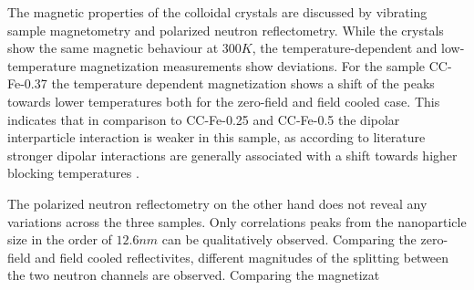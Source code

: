 \documentclass[\main/dresen_thesis.tex]{subfiles}
\begin{document}
  The magnetic properties of the colloidal crystals are discussed by vibrating sample magnetometry and polarized neutron reflectometry.
  While the crystals show the same magnetic behaviour at $300 \unit{K}$, the temperature-dependent and low-temperature magnetization measurements show deviations.
  For the sample CC-Fe-0.37 the temperature dependent magnetization shows a shift of the peaks towards lower temperatures both for the zero-field and field cooled case.
  This indicates that in comparison to CC-Fe-0.25 and CC-Fe-0.5 the dipolar interparticle interaction is weaker in this sample, as according to literature stronger dipolar interactions are generally associated with a shift towards higher blocking temperatures \cite{Morup_2010_Magne}.

  The polarized neutron reflectometry on the other hand does not reveal any variations across the three samples.
  Only correlations peaks from the nanoparticle size in the order of $12.6 \unit{nm}$ can be qualitatively observed.
  Comparing the zero-field and field cooled reflectivites, different magnitudes of the splitting between the two neutron channels are observed.
  Comparing the magnetizat
\end{document}
